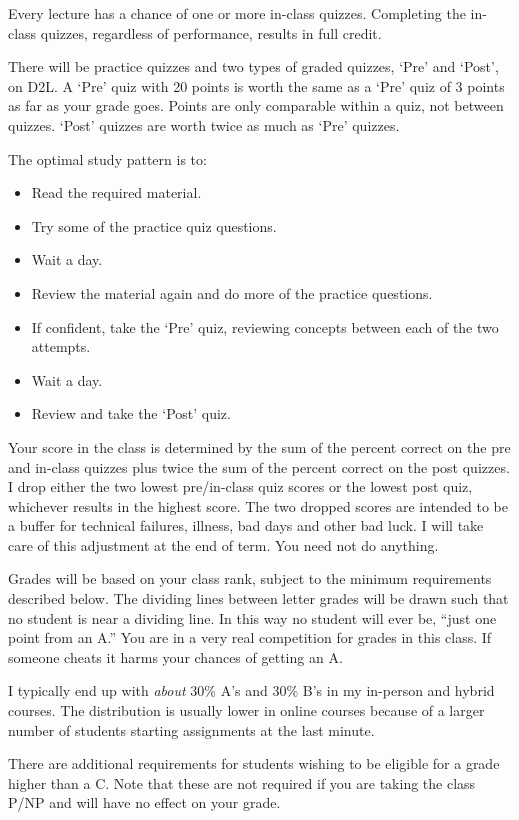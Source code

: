 \documentclass[letterpaper,10pt]{article}
\begin{document}
Every lecture has a chance of one or more in-class quizzes. Completing the
in-class quizzes, regardless of performance, results in full credit.

There will be practice quizzes and two types of graded quizzes, `Pre' and `Post', on D2L.  A `Pre'
quiz with 20 points is worth the same as a `Pre' quiz of 3 points as
far as your grade goes.  Points are only comparable within a quiz, not
between quizzes.  `Post' quizzes are worth twice as much as `Pre' quizzes.

The optimal study pattern is to:
\begin{itemize}
\item Read the required material.
\item Try some of the practice quiz questions.
\item Wait a day.
\item Review the material again and do more of the practice questions.
\item If confident, take the `Pre' quiz, reviewing concepts between each of the two attempts.
\item Wait a day.
\item Review and take the `Post' quiz.
\end{itemize}

Your score in the class is determined by the sum of the percent correct on the pre and in-class quizzes plus twice the sum of the percent correct on the post quizzes. I drop either the two
lowest pre/in-class quiz scores or the lowest post quiz, whichever results in the highest score. 
The two dropped scores are intended to be a buffer for technical
failures, illness, bad days and other bad luck.  I will take care of
this adjustment at the end of term.  You need not do anything.


Grades will be based on your class rank, subject to the minimum
requirements described below. The dividing lines between letter grades will be
drawn such that no student is near a dividing line. In this way no
student will ever be, ``just one point from an A.'' You are in a very
real competition for grades in this class. If someone cheats it harms
your chances of getting an A. 

I typically end up with \emph{about} 30\%
A's and 30\% B's in my in-person and hybrid courses.  The distribution is usually lower in online courses because of a larger number of students starting assignments at the last minute.   


There are additional requirements for students wishing to be eligible for a grade higher than a C.  Note that these are not required if you are taking the class P/NP and will have no effect on your grade.
\end{document}

